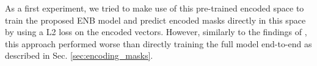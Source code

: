 As a first experiment, we tried to make use of this pre-trained encoded space to train the proposed ENB model and predict encoded masks directly in this space by using a L2 loss on the encoded vectors. However, similarly to the findings of \cite{hirsch2020patchperpix}, this approach performed worse than directly training the full model end-to-end as described in Sec. \ref{sec:encoding_masks}. \\



